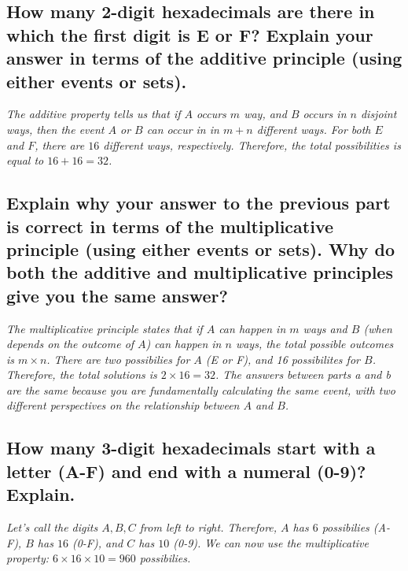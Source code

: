 \documentclass{article}
\begin{document}
\subsection{How many 2-digit hexadecimals are there in which the first digit is E or F?
 Explain your answer in terms of the additive principle (using either events or sets).}
\hspace{1cm}\textit{The additive property tells us that if $A$ occurs $m$ way, and $B$
 occurs in $n$ disjoint ways, then the event $A$ or $B$ can occur in in $m+n$ different ways.
 For both $E$ and $F$, there are $16$ different ways, respectively. Therefore, the total
 possibilities is equal to $16+16=32$.}
\subsection{Explain why your answer to the previous part is correct in terms of the
 multiplicative principle (using either events or sets).
 Why do both the additive and multiplicative principles give you the same answer?}
\hspace{1cm}\textit{The multiplicative principle states that if $A$ can happen in $m$ ways and $B$
 (when depends on the outcome of $A$) can happen in $n$ ways, the total possible outcomes is
 $m\times n$. There are two possibilies for $A$ (E or F), and 16 possibilites for $B$. Therefore,
 the total solutions is $2\times 16 = 32$. The answers between parts a and b are the same because
 you are fundamentally calculating the same event, with two different perspectives on the
 relationship between $A$ and $B$.}
\subsection{How many 3-digit hexadecimals start with a letter (A-F) and end with a numeral (0-9)? Explain.}
\hspace{1cm}\textit{Let's call the digits $A,B,C$ from left to right. Therefore, $A$ has $6$ possibilies (A-F),
 $B$ has $16$ (0-F), and $C$ has $10$ (0-9). We can now use the multiplicative property: 
 $6\times 16\times 10 = 960$ possibilies.}
\clearpage
\end{document}
